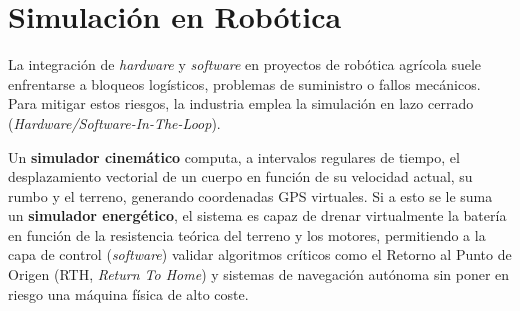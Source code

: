 \section{Simulación en Robótica}

La integración de \textit{hardware} y \textit{software} en proyectos de robótica agrícola suele enfrentarse a bloqueos logísticos, problemas de suministro o fallos mecánicos. Para mitigar estos riesgos, la industria emplea la simulación en lazo cerrado (\textit{Hardware/Software-In-The-Loop}).

Un \textbf{simulador cinemático} computa, a intervalos regulares de tiempo, el desplazamiento vectorial de un cuerpo en función de su velocidad actual, su rumbo y el terreno, generando coordenadas GPS virtuales. Si a esto se le suma un \textbf{simulador energético}, el sistema es capaz de drenar virtualmente la batería en función de la resistencia teórica del terreno y los motores, permitiendo a la capa de control (\textit{software}) validar algoritmos críticos como el Retorno al Punto de Origen (RTH, \textit{Return To Home}) y sistemas de navegación autónoma \cite{mousazadeh2013technical} sin poner en riesgo una máquina física de alto coste.
